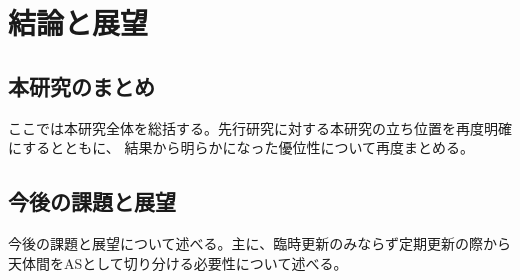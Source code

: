 \chapter{結論と展望}
\label{chap:conclusion}
\section{本研究のまとめ}
ここでは本研究全体を総括する。先行研究に対する本研究の立ち位置を再度明確にするとともに、
結果から明らかになった優位性について再度まとめる。
\section{今後の課題と展望}
今後の課題と展望について述べる。主に、臨時更新のみならず定期更新の際から
天体間をASとして切り分ける必要性について述べる。